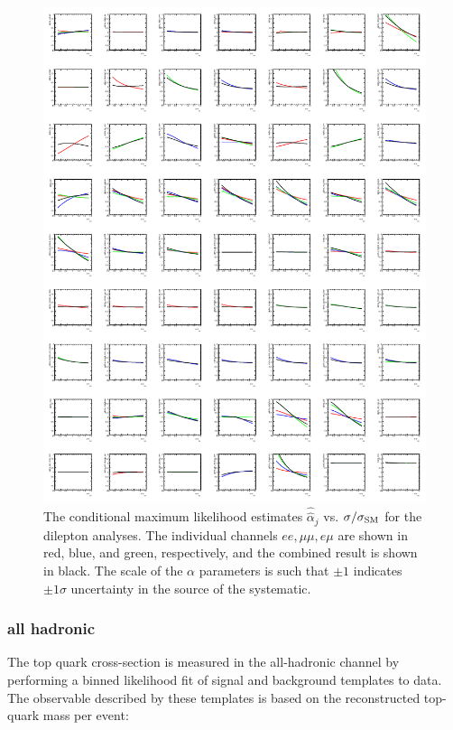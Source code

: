  \begin{figure}[htbp]
   \begin{center}
     \includegraphics[width=\textwidth]{figures/comb/DilepProfilePlots}
    \caption{The conditional maximum likelihood estimates $\hat{\hat{\alpha}}_j$ vs. $\sigma/\sigma_{\rm SM}$ for the dilepton analyses.  The individual channels $ee, \mu\mu, e\mu$ are shown in red, blue, and green, respectively, and the combined result is shown in black.  The scale of the $\alpha$ parameters is such that $\pm 1$ indicates $\pm 1\sigma$ uncertainty in the source of the systematic.}
     \label{fig:dilepton_profile}
   \end{center}
 \end{figure}


\subsubsection{all hadronic}
\label{sec:allhad}

The top quark cross-section is measured in the all-hadronic channel by performing a binned likelihood fit of signal and background templates to data.
The observable described by these templates is based on the reconstructed top-quark mass per event:

